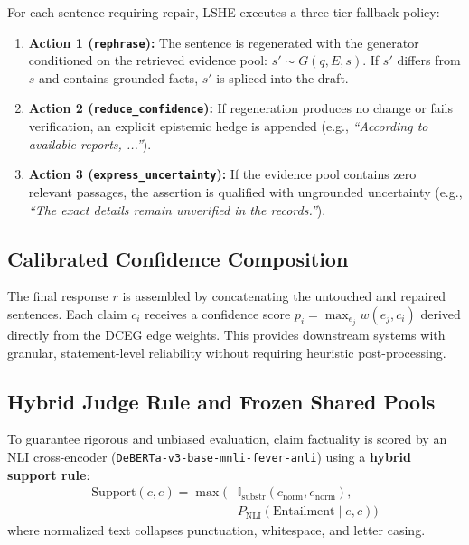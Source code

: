 For each sentence requiring repair, LSHE executes a three-tier fallback policy:
\begin{enumerate}
  \item \textbf{Action 1 (\texttt{rephrase}):} The sentence is regenerated with the generator conditioned on the retrieved evidence pool: $s' \sim G(q, E, s)$. If $s'$ differs from $s$ and contains grounded facts, $s'$ is spliced into the draft.
  \item \textbf{Action 2 (\texttt{reduce\_confidence}):} If regeneration produces no change or fails verification, an explicit epistemic hedge is appended (e.g., \emph{``According to available reports, ...''}).
  \item \textbf{Action 3 (\texttt{express\_uncertainty}):} If the evidence pool contains zero relevant passages, the assertion is qualified with ungrounded uncertainty (e.g., \emph{``The exact details remain unverified in the records.''}).
\end{enumerate}

\subsection{Calibrated Confidence Composition}
The final response $r$ is assembled by concatenating the untouched and repaired sentences. Each claim $c_i$ receives a confidence score $p_i = \max_{e_j} w(e_j, c_i)$ derived directly from the DCEG edge weights. This provides downstream systems with granular, statement-level reliability without requiring heuristic post-processing.

\subsection{Hybrid Judge Rule and Frozen Shared Pools}
To guarantee rigorous and unbiased evaluation, claim factuality is scored by an NLI cross-encoder (\texttt{DeBERTa-v3-base-mnli-fever-anli}) using a \textbf{hybrid support rule}:
\begin{equation}
\begin{aligned}
  \mathrm{Support}(c, e) = \max \big( & \mathbb{I}_{\text{substr}}(c_{\text{norm}}, e_{\text{norm}}), \\
  & P_{\text{NLI}}(\text{Entailment} \mid e, c) \big)
\end{aligned}
\end{equation}
where normalized text collapses punctuation, whitespace, and letter casing.

